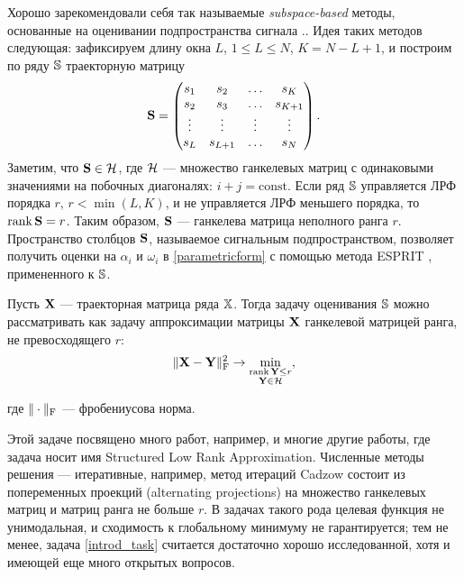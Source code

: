 \documentclass[12pt, specialist, subf,href,colorlinks=true,substylefile = spbu.rtx]{disser}
\def\rank{\mathop{\mathrm{rank}}}
\theoremstyle{remark}
\theoremstyle{definition}
\begin{document}
Хорошо зарекомендовали себя так называемые \emph{subspace-based} методы, основанные на оценивании подпространства сигнала \cite{Broomhead.King1986, Vautard.etal1992, Elsner.Tsonis1996, Golyandina.etal2001}.. 
Идея таких методов следующая: зафиксируем длину окна $L$, $1 \le L \le N$, $K = N - L + 1$, и построим по ряду $\mathbb{S}$ траекторную матрицу
\begin{equation*}
\mathbf{S} = \begin{pmatrix}
s_1 & s_2 & \ldots & s_K \\
s_2 & s_3 & \ldots & s_{K + 1} \\
\vdots & \vdots & \vdots & \vdots \\
s_L & s_{L + 1} & \ldots & s_N
\end{pmatrix}.
\end{equation*}
Заметим, что $\mathbf{S}\in \mathcal{H}$, где $\mathcal{H}$ --- множество ганкелевых матриц с одинаковыми значениями на побочных диагоналях: $i+j=\mathrm{const}$.
Если ряд $\mathbb{S}$ управляется ЛРФ порядка $r$, $r < \min(L, K)$, и не управляется ЛРФ меньшего порядка, то $\rank \bfS = r$. Таким образом, $\mathbf{S}$ --- ганкелева матрица неполного ранга $r$. Пространство столбцов $\mathbf{S}$, называемое сигнальным подпространством, позволяет получить оценки на $\alpha_i$ и $\omega_i$ в \eqref{parametricform} с помощью метода ESPRIT \cite{Roy.Kailath1989, Golyandina.Zhigljavsky2012}, примененного к $\mathbb{S}$.

Пусть $\mathbf{X}$ --- траекторная матрица ряда $\mathbb{X}$. Тогда задачу оценивания $\mathbb{S}$ можно рассматривать как задачу аппроксимации матрицы $\mathbf{X}$ ганкелевой матрицей ранга, не превосходящего $r$:
\begin{equation}\label{introd_task}
\|\bfX - \bfY\|^2_\rmF \to \min_{\substack{\rank \bfY \le r \\ \bfY \in \calH}},
\end{equation}

где $\|\cdot\|_{\mathrm{F}}$ --- фробениусова норма.

Этой задаче посвящено много работ, например, \cite{Cadzow1988, Markovsky2011, Usevich.Markovsky2014, Gillard.Zhigljavsky2013} и многие другие работы, где задача носит имя
Structured Low Rank Approximation. Численные методы решения --- итеративные, например, метод итераций Cadzow \cite{Cadzow1988} состоит из попеременных проекций (alternating projections) на множество ганкелевых матриц и матриц ранга не больше $r$. В задачах такого рода целевая функция не унимодальная, и сходимость к глобальному минимуму не гарантируется; тем не менее, задача \eqref{introd_task} считается достаточно хорошо исследованной, хотя и имеющей еще много открытых вопросов.
\end{document}

